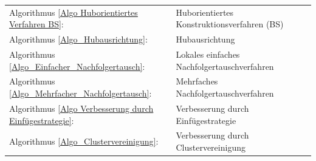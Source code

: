 \begin{tabular}{lp{10cm}cm{2cm}}
Algorithmus \ref{Algo Huborientiertes Verfahren BS}: 
& Huborientiertes Konstruktionsverfahren (BS)
& \pageref{Algo Huborientiertes Verfahren BS}\\

Algorithmus \ref{Algo_Hubausrichtung}: 
& Hubausrichtung
& \pageref{Algo_Hubausrichtung}\\

Algorithmus \ref{Algo_Einfacher_Nachfolgertausch}: 
& Lokales einfaches Nachfolgertauschverfahren
& \pageref{Algo_Einfacher_Nachfolgertausch}\\

Algorithmus \ref{Algo_Mehrfacher_Nachfolgertausch}: 
& Mehrfaches Nachfolgertauschverfahren
& \pageref{Algo_Mehrfacher_Nachfolgertausch}\\

Algorithmus \ref{Algo Verbesserung durch Einfügestrategie}: 
& Verbesserung durch Einfügestrategie
& \pageref{Algo Verbesserung durch Einfügestrategie}\\

Algorithmus \ref{Algo_Clustervereinigung}: 
& Verbesserung durch Clustervereinigung
& \pageref{Algo_Clustervereinigung}\\
\end{tabular}\\









